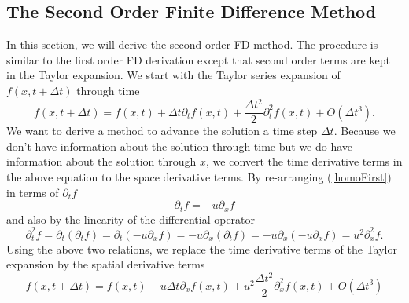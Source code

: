 \subsection{The Second Order Finite Difference Method}
In this section, we will derive the second order FD method. The procedure is similar to the first order FD derivation except that second order terms are kept in the Taylor expansion. We start with the Taylor series expansion of $f(x,t+\Delta t)$ through time
%
\begin{equation*}
f(x,t+\Delta t) = f(x,t) + \Delta t \partial_t f(x,t) + \frac{\Delta t^2}{2} \partial_t^2 f(x,t) + O(\Delta t^3).
\end{equation*}
%
We want to derive a method to advance the solution a time step $\Delta t$. Because we don't have information about the solution through time but we do have information about the solution through $x$, we convert the time derivative terms in the above equation to the space derivative terms. By re-arranging (\ref{homoFirst}) in terms of $\partial_t f$
%
\begin{equation}
\label{firstPart}
\partial_t f = -u \partial_x f
\end{equation}
%
and also by the linearity of the differential operator
%
\begin{equation}
\label{secondPart}
\partial_t^2 f = \partial_t(\partial_t f) = \partial_t(-u \partial_x f) = -u \partial_x(\partial_t f) = -u \partial_x(-u \partial_x f) = u^2 \partial_x^2 f.
\end{equation}
%
%
Using the above two relations, we replace the time derivative terms of the Taylor expansion by the spatial derivative terms
%
\begin{equation*}
f(x,t+\Delta t) = f(x,t) - u \Delta t \partial_x f(x,t) + u^2 \frac{\Delta t^2}{2} \partial_x^2 f(x,t) + O(\Delta t^3)
\end{equation*}
